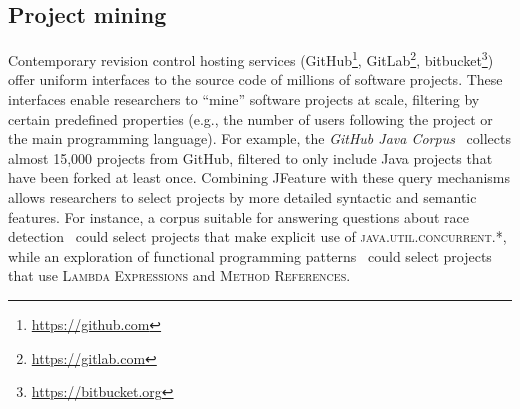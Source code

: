 \subsection{Project mining}
Contemporary revision control hosting services (GitHub\footnote{\url{https://github.com}}, GitLab\footnote{\url{https://gitlab.com}}, bitbucket\footnote{\url{https://bitbucket.org}}) offer uniform interfaces to the source code of millions of software projects.
These interfaces enable researchers to ``mine'' software projects at scale, filtering by certain predefined properties (e.g., the number of users following the project or the main programming language).
For example, the \textit{GitHub Java Corpus}~\cite{githubCorpus2013} collects almost 15,000 projects from GitHub, filtered to only include Java projects that have been forked at least once.
Combining JFeature with these query mechanisms allows researchers to select projects by more detailed syntactic and semantic features.
For instance, a corpus suitable for answering questions about race detection~\cite{li2014rfbi}
could select projects that make explicit use of \textsc{java.util.concurrent.*},
while an exploration of functional programming patterns~\cite{cok2018reasoning} could select projects that use \textsc{Lambda Expressions} and \textsc{Method References}.
